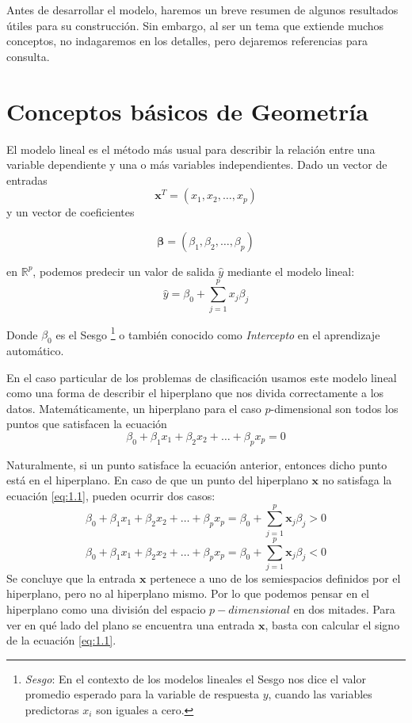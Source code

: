 \documentclass[letterpaper,12pt,oneside]{book}
\begin{document}
{{Antes de desarrollar el modelo, haremos un breve resumen de algunos resultados útiles para su construcción. Sin embargo, al ser un tema que extiende muchos conceptos, no indagaremos en los detalles, pero dejaremos referencias para consulta.
}  
    

   
   
   
   \section{Conceptos básicos de Geometría}
   {
El modelo lineal es el método más usual para describir la relación entre una variable dependiente y una o más variables independientes. Dado un vector de entradas 
$$\textbf{x} ^ T = (x_1, x_2, \ldots, x_p)$$
y un vector de coeficientes 

$$ \boldsymbol{\beta} = (\beta_1, \beta_2, \ldots, \beta_p)$$

en $\mathbb{R}^p$, podemos predecir un valor de salida $\hat{y}$ mediante el modelo lineal:
$$ \hat{y}=\beta_0+\sum_{j=1}^{p} x_j \beta_j$$

Donde $\beta_0$ es el Sesgo \footnote{\textit{Sesgo}: En el contexto de los modelos lineales el Sesgo nos dice el valor promedio esperado para la variable de respuesta $y$,  cuando las variables predictoras $x_i$ son iguales a cero.} o también conocido como \textit{Intercepto} en el aprendizaje automático.

En el caso particular de los problemas de clasificación usamos este modelo lineal como una forma de describir el hiperplano que nos divida correctamente a los datos. Matemáticamente, un hiperplano para el caso $p$-dimensional son todos los puntos que satisfacen la ecuación 
\begin{equation}\label{eq:1.1}
	\beta_0 + \beta_1 x_1+\beta_2 x_2 + \dots +\beta_p x_p=0
\end{equation} 

Naturalmente, si un punto satisface la ecuación anterior, entonces dicho punto está en el hiperplano. En caso de que un punto del hiperplano $\textbf{x}$ no satisfaga la ecuación \eqref{eq:1.1}, pueden ocurrir dos casos:
 \begin{equation}
	\beta_0 + \beta_1 x_1+\beta_2 x_2 + \dots +\beta_p x_p= \beta_0+\sum_{j=1}^{p} 				\textbf{x}_j \beta_j>0
\end{equation}
 \begin{equation}
	\beta_0 + \beta_1 x_1+\beta_2 x_2 + \dots +\beta_p x_p=\beta_0+\sum_{j=1}^{p} 				\textbf{x}_j \beta_j<0 
\end{equation}
Se concluye que la entrada $\textbf{x}$ pertenece a uno de los semiespacios definidos por el hiperplano, pero no al hiperplano mismo. Por lo que podemos pensar en el hiperplano como una división del espacio $p-dimensional$ en dos mitades. Para ver en qué lado del plano se encuentra una entrada $\textbf{x}$, basta con calcular el signo de la ecuación \eqref{eq:1.1}. 

}}
\end{document}
